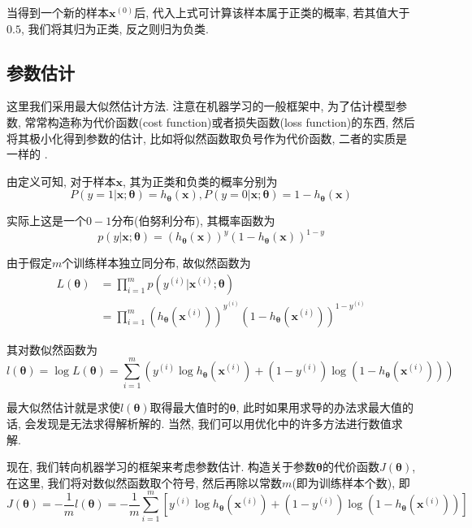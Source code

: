\documentclass[a4paper,UTF8]{ctexart}
\theoremstyle{plain} \newtheorem{theorem}{定理}[section]
\theoremstyle{plain} \newtheorem{definition}{定义}[section]
\theoremstyle{plain} \newtheorem{lemma}{引理}[section]
\theoremstyle{plain} \newtheorem{proposition}{命题}[section]
\theoremstyle{plain} \newtheorem{example}{例}[section]
\theoremstyle{plain} \newtheorem{remark}{注}[section]
\theoremstyle{plain} \newtheorem{corollary}{推论}[section]
\begin{document}
当得到一个新的样本$\bm{x}^{(0)}$后, 代入上式可计算该样本属于正类的概率, 若其值大于$0.5$, 我们将其归为正类, 反之则归为负类.


\subsection{参数估计}
这里我们采用最大似然估计方法. 注意在机器学习的一般框架中, 为了估计模型参数, 常常构造称为代价函数(cost function)或者损失函数(loss function)的东西, 然后将其极小化得到参数的估计, 比如将似然函数取负号作为代价函数, 二者的实质是一样的
.

由定义可知, 对于样本$\bm{x}$, 其为正类和负类的概率分别为
\begin{equation*}
P(y = 1 | \bm{x}; \bm{\theta}) = h_{\bm{\theta}}(\bm{x}),  P(y = 0 | \bm{x}; \bm{\theta}) = 1 - h_{\bm{\theta}}(\bm{x})
\end{equation*}

实际上这是一个$0-1$分布(伯努利分布), 其概率函数为
\begin{equation*}
p(y | \bm{x}; \bm{\theta}) = (h_{\bm{\theta}}(\bm{x}))^{y} (1 - h_{\bm{\theta}}(\bm{x}))^{1 - y}
\end{equation*}

由于假定$m$个训练样本独立同分布, 故似然函数为
\begin{align*}
L(\bm{\theta}) & = \prod_{i=1}^{m} p(y^{(i)} | \bm{x}^{(i)}; \bm{\theta}) \\
& = \prod_{i=1}^{m} (h_{\bm{\theta}}(\bm{x}^{(i)}))^{y^{(i)}} (1 - h_{\bm{\theta}}(\bm{x}^{(i)}))^{1 - y^{(i)}}
\end{align*}

其对数似然函数为
\begin{equation*}
l(\bm{\theta}) = \log L(\bm{\theta}) = \sum_{i=1}^{m} \left( y^{(i)} \log h_{\bm{\theta}}(\bm{x}^{(i)}) + (1 - y^{(i)}) \log (1 - h_{\bm{\theta}}(\bm{x}^{(i)})) \right)
\end{equation*}

最大似然估计就是求使$l(\bm{\theta})$取得最大值时的$\bm{\theta}$, 此时如果用求导的办法求最大值的话, 会发现是无法求得解析解的. 当然, 我们可以用优化中的许多方法进行数值求解.

现在, 我们转向机器学习的框架来考虑参数估计. 构造关于参数$\bm{\theta}$的代价函数$J(\bm{\theta})$, 在这里, 我们将对数似然函数取个符号, 然后再除以常数$m$(即为训练样本个数), 即
\begin{equation*}
J(\bm{\theta}) = - \frac{1}{m} l(\bm{\theta}) = - \frac{1}{m} \sum_{i=1}^{m} \left[ y^{(i)} \log h_{\bm{\theta}}(\bm{x}^{(i)}) + (1 - y^{(i)}) \log (1 - h_{\bm{\theta}}(\bm{x}^{(i)})) \right]
\end{equation*}
\end{document}

